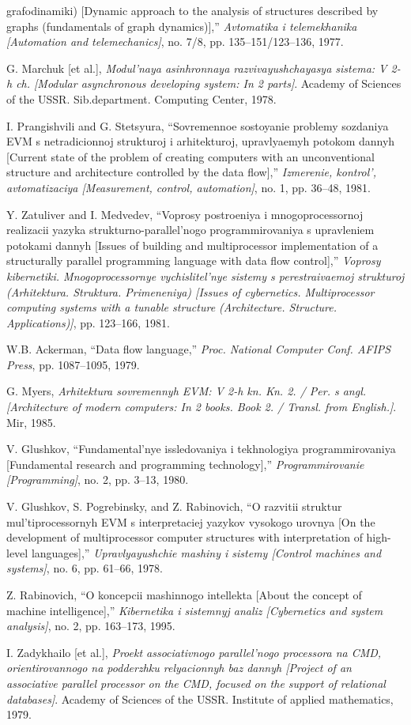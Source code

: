 \documentclass{article}
\begin{document}
{\begin{multicols}{2}
{\begin{thebibliography}{65}
grafodinamiki) [Dynamic approach to the analysis of structures
described by graphs (fundamentals of graph dynamics)],” \textit{Avtomatika i telemekhanika [Automation and telemechanics]}, no.
7/8, pp. 135–151/123–136, 1977.
    \item  G. Marchuk [et al.], \textit{Modul’naya asinhronnaya
razvivayushchayasya sistema: V 2-h ch. [Modular asynchronous
developing system: In 2 parts]}. Academy of Sciences of the
USSR. Sib.department. Computing Center, 1978.
    \item
    I. Prangishvili and G. Stetsyura, “Sovremennoe sostoyanie problemy sozdaniya EVM s netradicionnoj strukturoj i arhitekturoj,
upravlyaemyh potokom dannyh [Current state of the problem
of creating computers with an unconventional structure and
architecture controlled by the data flow],” \textit{Izmerenie, kontrol’,
avtomatizaciya [Measurement, control, automation]}, no. 1, pp.
36–48, 1981.
    \item Y. Zatuliver and I. Medvedev, “Voprosy postroeniya i mnogoprocessornoj realizacii yazyka strukturno-parallel’nogo programmirovaniya s upravleniem potokami dannyh [Issues of
building and multiprocessor implementation of a structurally
parallel programming language with data flow control],” \textit{Voprosy kibernetiki. Mnogoprocessornye vychislitel’nye sistemy s
perestraivaemoj strukturoj (Arhitektura. Struktura. Primeneniya)
[Issues of cybernetics. Multiprocessor computing systems with
a tunable structure (Architecture. Structure. Applications)]}, pp.
123–166, 1981.
    \item
    W.B. Ackerman, “Data flow language,” \textit{Proc. National Computer
Conf. AFIPS Press}, pp. 1087–1095, 1979.
    \item G. Myers, \textit{Arhitektura sovremennyh EVM: V 2-h kn. Kn. 2. / Per.
s angl. [Architecture of modern computers: In 2 books. Book 2. /
Transl. from English.]}. Mir, 1985.
    \item V. Glushkov, “Fundamental’nye issledovaniya i tekhnologiya
programmirovaniya [Fundamental research and programming
technology],” \textit{Programmirovanie [Programming]}, no. 2, pp. 3–13,
1980.
    \item V. Glushkov, S. Pogrebinsky, and Z. Rabinovich, “O razvitii struktur mul’tiprocessornyh EVM s interpretaciej yazykov
vysokogo urovnya [On the development of multiprocessor computer structures with interpretation of high-level languages],”
\textit{Upravlyayushchie mashiny i sistemy [Control machines and
systems]}, no. 6, pp. 61–66, 1978.
    \item Z. Rabinovich, “O koncepcii mashinnogo intellekta [About the
concept of machine intelligence],” \textit{Kibernetika i sistemnyj analiz
[Cybernetics and system analysis]}, no. 2, pp. 163–173, 1995.
    \item I. Zadykhailo [et al.], \textit{Proekt associativnogo parallel’nogo processora na CMD, orientirovannogo na podderzhku relyacionnyh baz
dannyh [Project of an associative parallel processor on the CMD,
focused on the support of relational databases]}. Academy of
Sciences of the USSR. Institute of applied mathematics, 1979.


\end{thebibliography}}
\end{multicols}}
\end{document}
